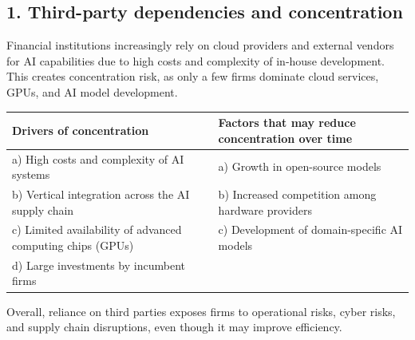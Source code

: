 
\subsection*{1. Third-party dependencies and concentration}

Financial institutions increasingly rely on cloud providers and external vendors for AI
capabilities due to high costs and complexity of in-house development. This creates
concentration risk, as only a few firms dominate cloud services, GPUs, and AI model
development.

\begin{cifigblock}
{\centering
\renewcommand{\arraystretch}{1.2}
\begin{tabularx}{\textwidth}{@{}>{\raggedright\arraybackslash}X >{\raggedright\arraybackslash}X@{}}
\toprule
\rowcolor{FRMSoft}
{\sffamily\bfseries\color{FRMRed}Drivers of concentration} &
{\sffamily\bfseries\color{FRMGreen}Factors that may reduce concentration over time}\\
\midrule
a) High costs and complexity of AI systems & a) Growth in open-source models\\
b) Vertical integration across the AI supply chain & b) Increased competition among hardware
providers\\
c) Limited availability of advanced computing chips (GPUs) & c) Development of
domain-specific AI models\\
d) Large investments by incumbent firms & \\
\bottomrule
\end{tabularx}
\par}
\end{cifigblock}

Overall, reliance on third parties exposes firms to operational risks, cyber risks, and
supply chain disruptions, even though it may improve efficiency.

